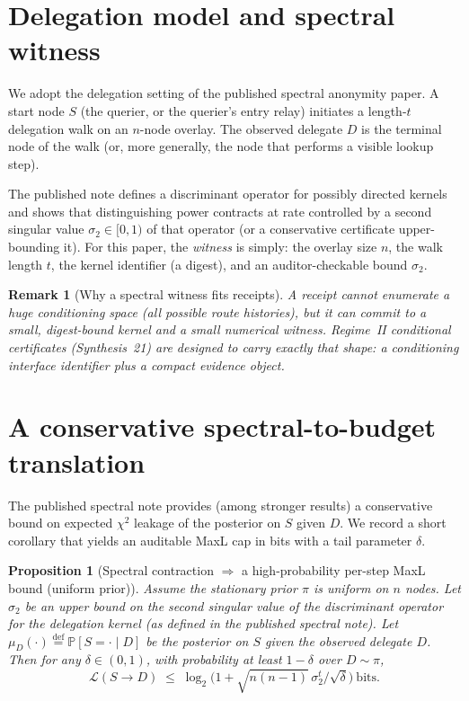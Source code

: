 \documentclass[11pt]{article}
\newtheorem{proposition}{Proposition}
\newtheorem{remark}{Remark}
\newcommand{\PP}{\mathbb{P}}
\newcommand{\defeq}{\stackrel{\mathrm{def}}{=}}
\newcommand{\MaxL}{\mathcal{L}}
\begin{document}
\section{Delegation model and spectral witness}
\label{sec:model}

We adopt the delegation setting of the published spectral anonymity paper.\cite{series:spectral}
A start node $S$ (the querier, or the querier's entry relay) initiates a length-$t$ delegation walk on an $n$-node overlay.
The observed delegate $D$ is the terminal node of the walk (or, more generally, the node that performs a visible lookup step).

The published note defines a discriminant operator for possibly directed kernels and shows that distinguishing power contracts at rate controlled by a
second singular value $\sigma_2\in[0,1)$ of that operator (or a conservative certificate upper-bounding it).\cite{series:spectral}
For this paper, the \emph{witness} is simply: the overlay size $n$, the walk length $t$, the kernel identifier (a digest), and an auditor-checkable bound $\sigma_2$.

\begin{remark}[Why a spectral witness fits receipts]
A receipt cannot enumerate a huge conditioning space (all possible route histories), but it \emph{can} commit to a small, digest-bound kernel and a small numerical witness.
Regime~II conditional certificates (Synthesis~21) are designed to carry exactly that shape: a conditioning interface identifier plus a compact evidence object.\cite{series:condcert}
\end{remark}


\section{A conservative spectral-to-budget translation}
\label{sec:translation}

The published spectral note provides (among stronger results) a conservative bound on expected $\chi^2$ leakage of the posterior on $S$ given $D$.\cite{series:spectral}
We record a short corollary that yields an auditable MaxL cap in bits with a tail parameter $\delta$.

\begin{proposition}[Spectral contraction $\Rightarrow$ a high-probability per-step MaxL bound (uniform prior)]
\label{prop:spectral-to-maxl}
Assume the stationary prior $\pi$ is uniform on $n$ nodes.
Let $\sigma_2$ be an upper bound on the second singular value of the discriminant operator for the delegation kernel (as defined in the published spectral note).\cite{series:spectral}
Let $\mu_D(\cdot)\defeq \PP[S=\cdot\mid D]$ be the posterior on $S$ given the observed delegate $D$.
Then for any $\delta\in(0,1)$, with probability at least $1-\delta$ over $D\sim\pi$,
\[
\MaxL(S\!\to\!D)
\;\le\;
\log_2\!\Big(1+\sqrt{n(n-1)}\,\sigma_2^{t}/\sqrt{\delta}\Big)\ \text{bits}.
\]
\end{proposition}
\end{document}
